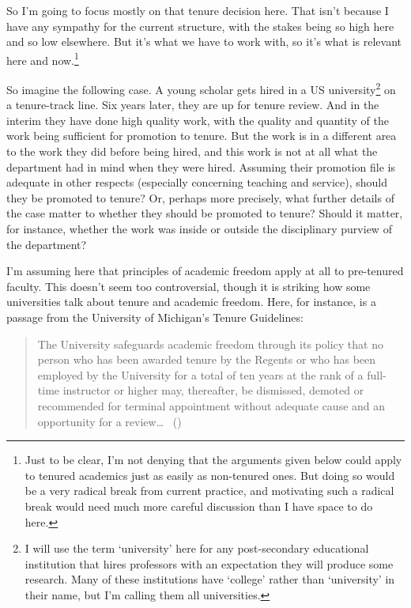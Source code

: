 \documentclass[
  10pt,
  letterpaper,
  DIV=11,
  numbers=noendperiod,
  twoside]{scrartcl}
\begin{document}
So I'm going to focus mostly on that tenure decision here. That isn't
because I have any sympathy for the current structure, with the stakes
being so high here and so low elsewhere. But it's what we have to work
with, so it's what is relevant here and now.\footnote{Just to be clear,
  I'm not denying that the arguments given below could apply to tenured
  academics just as easily as non-tenured ones. But doing so would be a
  very radical break from current practice, and motivating such a
  radical break would need much more careful discussion than I have
  space to do here.}

So imagine the following case. A young scholar gets hired in a US
university\footnote{I will use the term `university' here for any
  post-secondary educational institution that hires professors with an
  expectation they will produce some research. Many of these
  institutions have `college' rather than `university' in their name,
  but I'm calling them all universities.} on a tenure-track line. Six
years later, they are up for tenure review. And in the interim they have
done high quality work, with the quality and quantity of the work being
sufficient for promotion to tenure. But the work is in a different area
to the work they did before being hired, and this work is not at all
what the department had in mind when they were hired. Assuming their
promotion file is adequate in other respects (especially concerning
teaching and service), should they be promoted to tenure? Or, perhaps
more precisely, what further details of the case matter to whether they
should be promoted to tenure? Should it matter, for instance, whether
the work was inside or outside the disciplinary purview of the
department?

I'm assuming here that principles of academic freedom apply at all to
pre-tenured faculty. This doesn't seem too controversial, though it is
striking how some universities talk about tenure and academic freedom.
Here, for instance, is a passage from the University of Michigan's
Tenure Guidelines:

\begin{quote}
The University safeguards academic freedom through its policy that no
person who has been awarded tenure by the Regents or who has been
employed by the University for a total of ten years at the rank of a
full-time instructor or higher may, thereafter, be dismissed, demoted or
recommended for terminal appointment without adequate cause and an
opportunity for a review\ldots{} ~()
\end{quote}
\end{document}
